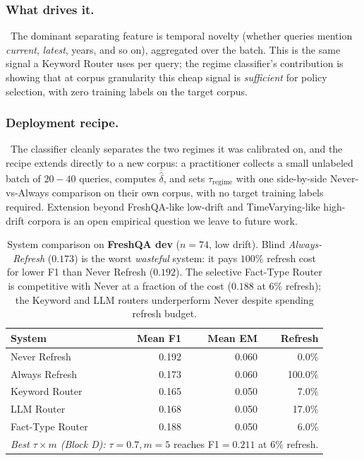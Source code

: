 \documentclass[pdflatex,sn-basic]{sn-jnl}
\begin{document}
\subsubsection*{What drives it.}~The dominant separating feature is temporal novelty (whether queries mention \emph{current}, \emph{latest}, years, and so on), aggregated over the batch. This is the same signal a Keyword Router uses per query; the regime classifier's contribution is showing that at corpus granularity this cheap signal is \emph{sufficient} for policy selection, with zero training labels on the target corpus.

\subsubsection*{Deployment recipe.}~The classifier cleanly separates the two regimes it was calibrated on, and the recipe extends directly to a new corpus: a practitioner collects a small unlabeled batch of $20{-}40$ queries, computes $\overline{\hat\delta}$, and sets $\tau_{\text{regime}}$ with one side-by-side Never-vs-Always comparison on their own corpus, with no target training labels required. Extension beyond FreshQA-like low-drift and TimeVarying-like high-drift corpora is an open empirical question we leave to future work.

\begin{table}[htbp]
\caption{System comparison on \textbf{FreshQA dev} ($n{=}74$, low drift). Blind \emph{Always-Refresh} ($0.173$) is the worst \emph{wasteful} system: it pays $100\%$ refresh cost for lower F1 than Never Refresh ($0.192$). The selective Fact-Type Router is competitive with Never at a fraction of the cost ($0.188$ at $6\%$ refresh); the Keyword and LLM routers underperform Never despite spending refresh budget.}
\label{tab:freshqa}
\centering
\begin{tabular}{lrrr}
\toprule
System & Mean F1 & Mean EM & Refresh \\
\midrule
Never Refresh & 0.192 & 0.060 & 0.0\% \\
Always Refresh & 0.173 & 0.060 & 100.0\% \\
Keyword Router & 0.165 & 0.050 & 7.0\% \\
LLM Router & 0.168 & 0.050 & 17.0\% \\
Fact-Type Router & 0.188 & 0.050 & 6.0\% \\
\midrule
\multicolumn{4}{l}{\emph{Best $\tau{\times}m$ (Block D):} $\tau{=}0.7, m{=}5$ reaches F1$=0.211$ at $6\%$ refresh.} \\
\bottomrule
\end{tabular}
\end{table}
\end{document}
